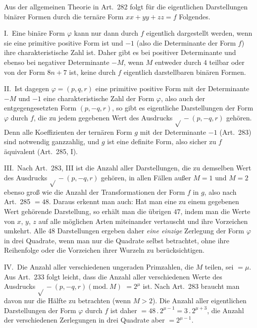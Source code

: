 Aus der allgemeinen Theorie in Art.\ 282 folgt für die eigentlichen
Darstellungen binärer Formen durch die ternäre Form $xx+yy+zz=f$ Folgendes.

I.\ Eine binäre Form $\varphi$ kann nur dann durch $f$ eigentlich
dargestellt werden, wenn sie eine primitive positive Form ist und
$-1$ (also die Determinante der Form $f$) ihre charakteristische
Zahl ist. Daher gibt es bei positiver Determinante und ebenso bei
negativer Determinante $-M$, wenn $M$ entweder durch $4$
teilbar oder von der Form $8n+7$ ist, keine durch $f$ eigentlich
darstellbaren binären Formen.

II.\ Ist dagegen $\varphi=(p,q,r)$ eine primitive positive Form mit der
Determinante $-M$ und $-1$ eine charakteristische Zahl der
Form $\varphi$, also auch der entgegengesetzten Form $(p,-q,r)$, so gibt
es eigentliche Darstellungen der Form $\varphi$ durch $f$, die zu
jedem gegebenen Wert des Ausdrucks $\surd{}-(p,-q,r)$ gehören. Denn alle Koeffizienten
der ternären Form $g$ mit der Determinante $-1$ (Art.\ 283)
sind notwendig ganzzahlig, und $g$ ist eine definite Form, also
sicher zu $f$ äquivalent (Art.\ 285, I).

III.\ Nach Art.\ 283, III ist die Anzahl aller Darstellungen, die
zu demselben Wert des Ausdrucks $\surd{}-(p,-q,r)$ gehören, in allen Fällen
außer $M=1$ und $M=2$ ebenso groß wie die Anzahl der Transformationen
der Form $f$ in $g$, also nach Art.\ 285 $=48$. Daraus
erkennt man auch: Hat man eine zu einem gegebenen Wert gehörende
Darstellung, so erhält man die übrigen $47$, indem man die Werte
von $x$, $y$, $z$
auf alle möglichen Arten miteinander vertauscht und ihre Vorzeichen
umkehrt. Alle $48$ Darstellungen ergeben daher \textit{eine einzige}
Zerlegung der Form $\varphi$ in drei Quadrate, wenn man nur die Quadrate
selbst betrachtet, ohne ihre Reihenfolge oder die Vorzeichen ihrer
Wurzeln zu berücksichtigen.

IV.\ Die Anzahl aller verschiedenen ungeraden Primzahlen, die $M$
teilen, sei $=\mu$. Aus Art.\ 233 folgt leicht, dass die Anzahl
aller verschiedenen Werte des Ausdrucks $\surd{}-(p,\allowbreak -q,\allowbreak r)(\mathrm{mod.}\ M)$ $=2^\mu$ ist.
Nach Art.\ 283 braucht man davon nur die Hälfte zu betrachten
(wenn $M>2$). Die Anzahl aller eigentlichen Darstellungen der
Form $\varphi$ durch $f$ ist daher $=48\,\allowbreak  .\,\allowbreak  2^{\mu-1}=3\,\allowbreak  .\,\allowbreak  2^{\mu+3}$, die Anzahl der verschiedenen
Zerlegungen in drei Quadrate aber $=2^{\mu-1}$.

